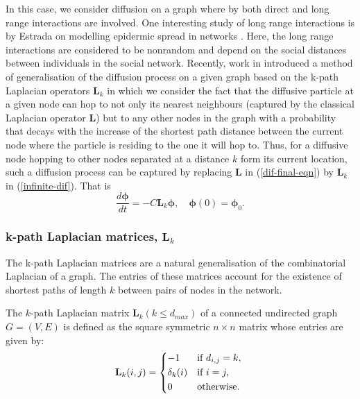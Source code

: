 \documentclass[10pt,a4paper]{article}
\begin{document}
    	    
    	   	In this case, we consider diffusion on a graph where by both direct and long range interactions are involved. One interesting study of long range interactions is by Estrada on modelling epidermic spread in networks \citep{estrada2011epidemic}. Here, the long range interactions are considered to be nonrandom and depend on the social distances between individuals in the social network.
    	    Recently, work in \citep{estrada2012path} introduced a method of generalisation of the diffusion process on a given graph based on the k-path Laplacian operators $\mathbf{L}_k$ in which we consider the fact that the diffusive particle at a given node can hop to not only its nearest neighbours (captured by the classical Laplacian operator $\mathbf{L}$) but to any other nodes in the graph with a probability that decays with the increase of the shortest path distance between the current node where the particle is residing to the one it will hop to. Thus, for a diffusive node hopping to other nodes separated at a distance $k$ form its current location, such a diffusion process can be captured by replacing $\mathbf{L}$ in (\ref{dif-final-eqn}) by $\mathbf{L}_k$ in (\ref{infinite-dif}). That is 
    	    \begin{equation}
    	    \frac{d\boldsymbol{\phi}}{dt} = -C\mathbf{L}_{k}\boldsymbol{\phi}, \quad \boldsymbol{\phi}(0) = \boldsymbol{\phi}_0 .
    	    \label{gen-difeqn}
    	    \end{equation}
    	    \subsubsection{ k-path Laplacian matrices, $\mathbf{L}_k$}
    	    
    	    The k-path Laplacian matrices are a natural generalisation of the combinatorial Laplacian of a graph. The entries of these matrices account for the existence of shortest paths of length $k$ between pairs of nodes in the network.
    	    
    	    The $k$-path Laplacian matrix $\mathbf{L}_{k} (k \leq d_{max})$ of a connected undirected graph $G=(V,E)$ is defined as the square symmetric $n\times n$ matrix whose entries are given by:
    	    \begin{equation}
    	    \mathbf{L}_k(i,j) =  \begin{cases*}
    	    -1 & if  $d_{i,j} = k,$  \\
    	    \delta_{k}(i) & if $i = j,$ \\
    	    0 & otherwise.
    	    \end{cases*}
    	    \label{kpathlap}
    	    \end{equation}
    	    
\end{document}
